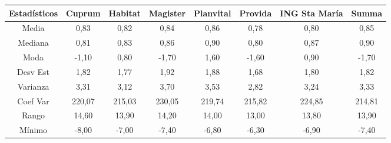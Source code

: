 \begin{center}
\begin{small}
\begin{tabular}{|l|l|l|l|l|l|l|l|}
\hline
\multicolumn{1}{|c|}{Estad\'isticos} & \multicolumn{1}{c|}{Cuprum} & \multicolumn{1}{c|}{Habitat} & \multicolumn{1}{c|}{Magister} & \multicolumn{1}{c|}{Planvital} & \multicolumn{1}{c|}{Provida} & \multicolumn{1}{c|}{ING Sta Mar\'ia} & \multicolumn{1}{c|}{Summa} \\
\hline
\multicolumn{1}{|c|}{Media} & \multicolumn{1}{c|}{0,83} & \multicolumn{1}{c|}{0,82} & \multicolumn{1}{c|}{0,84} & \multicolumn{1}{c|}{0,86} & \multicolumn{1}{c|}{0,78} & \multicolumn{1}{c|}{0,80} & \multicolumn{1}{c|}{0,85} \\
\multicolumn{1}{|c|}{Mediana} & \multicolumn{1}{c|}{0,81} & \multicolumn{1}{c|}{0,83} & \multicolumn{1}{c|}{0,86} & \multicolumn{1}{c|}{0,90} & \multicolumn{1}{c|}{0,80} & \multicolumn{1}{c|}{0,87} & \multicolumn{1}{c|}{0,90} \\
\multicolumn{1}{|c|}{Moda} & \multicolumn{1}{c|}{-1,10} & \multicolumn{1}{c|}{0,80} & \multicolumn{1}{c|}{-1,70} & \multicolumn{1}{c|}{1,60} & \multicolumn{1}{c|}{-1,60} & \multicolumn{1}{c|}{0,90} & \multicolumn{1}{c|}{-1,70} \\
\multicolumn{1}{|c|}{Desv Est} & \multicolumn{1}{c|}{1,82} & \multicolumn{1}{c|}{1,77} & \multicolumn{1}{c|}{1,92} & \multicolumn{1}{c|}{1,88} & \multicolumn{1}{c|}{1,68} & \multicolumn{1}{c|}{1,80} & \multicolumn{1}{c|}{1,82} \\
\multicolumn{1}{|c|}{Varianza } & \multicolumn{1}{c|}{3,31} & \multicolumn{1}{c|}{3,12} & \multicolumn{1}{c|}{3,70} & \multicolumn{1}{c|}{3,53} & \multicolumn{1}{c|}{2,82} & \multicolumn{1}{c|}{3,24} & \multicolumn{1}{c|}{3,33} \\
\multicolumn{1}{|c|}{Coef Var} & \multicolumn{1}{c|}{220,07} & \multicolumn{1}{c|}{215,03} & \multicolumn{1}{c|}{230,05} & \multicolumn{1}{c|}{219,74} & \multicolumn{1}{c|}{215,82} & \multicolumn{1}{c|}{224,85} & \multicolumn{1}{c|}{214,81} \\
\multicolumn{1}{|c|}{Rango} & \multicolumn{1}{c|}{14,60} & \multicolumn{1}{c|}{13,90} & \multicolumn{1}{c|}{14,20} & \multicolumn{1}{c|}{14,00} & \multicolumn{1}{c|}{13,00} & \multicolumn{1}{c|}{13,80} & \multicolumn{1}{c|}{13,90} \\
\multicolumn{1}{|c|}{M\'inimo} & \multicolumn{1}{c|}{-8,00} & \multicolumn{1}{c|}{-7,00} & \multicolumn{1}{c|}{-7,40} & \multicolumn{1}{c|}{-6,80} & \multicolumn{1}{c|}{-6,30} & \multicolumn{1}{c|}{-6,90} & \multicolumn{1}{c|}{-7,40} \\

\end{tabular}
\end{small}
\end{center}
